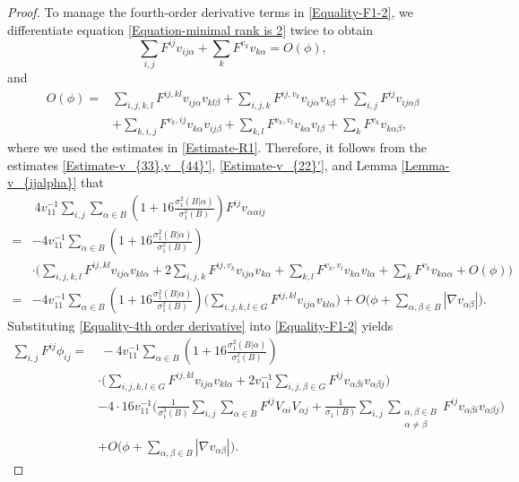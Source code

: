 \documentclass[11pt]{amsart}
\numberwithin{theorem}{section}
\numberwithin{equation}{section}
\begin{document}
\begin{proof}
To manage the fourth-order derivative terms in \eqref{Equality-F1-2}, we differentiate equation \eqref{Equation-minimal rank is 2} twice to obtain
\begin{equation}\label{Relation-1st condition-2}
\sum_{i, j}F^{ij}v_{ij\alpha}+\sum_kF^{v_k}v_{k\alpha}=O(\phi),
\end{equation}
and
\begin{align*}
O(\phi)=&\sum_{i,j,k,l}F^{ij,kl}v_{ij\alpha}v_{kl\beta}+\sum_{i,j,k}F^{ij,v_k}v_{ij\alpha}v_{k\beta}+\sum_{i,j}F^{ij}v_{ij\alpha\beta}\\
&+\sum_{k,i,j}F^{v_k,ij}v_{k\alpha}v_{ij\beta}+\sum_{k,l}F^{v_k,v_l}v_{k\alpha}v_{l\beta}+\sum_kF^{v_k}v_{k\alpha\beta},
\end{align*}
where we used the estimates in \eqref{Estimate-R1}. Therefore, it follows from the estimates \eqref{Estimate-v_{33},v_{44}'}, \eqref{Estimate-v_{22}'}, and Lemma \ref{Lemma-v_{ijalpha}} that
\begin{equation}\label{Equality-4th order derivative}
\begin{aligned}
&~4v_{11}^{-1}\sum_{i,j}\sum_{\alpha\in B}\left(1+16\frac{\sigma_1^2(B|\alpha)}{\sigma_1^2(B)}\right)F^{ij}v_{\alpha\alpha ij}\\
=&-4v_{11}^{-1}\sum_{\alpha\in B}\left(1+16\frac{\sigma_1^2(B|\alpha)}{\sigma_1^2(B)}\right)\\
&\cdot\bigg(\sum_{i,j,k,l}F^{ij,kl}v_{ij\alpha}v_{kl\alpha}+2\sum_{i,j,k}F^{ij,v_k}v_{ij\alpha}v_{k\alpha}+\sum_{k,l}F^{v_k,v_l}v_{k\alpha}v_{l\alpha}+\sum_kF^{v_k}v_{k\alpha\alpha}+O(\phi)\bigg)\\
=&-4v_{11}^{-1}\sum_{\alpha\in B}\left(1+16\frac{\sigma_1^2(B|\alpha)}{\sigma_1^2(B)}\right)\bigg(\sum_{i,j,k,l\in G}F^{ij,kl}v_{ij\alpha}v_{kl\alpha}\bigg)+O\bigg(\phi+\sum_{\alpha,\beta\in B}|\nabla v_{\alpha\beta}|\bigg).
\end{aligned}
\end{equation}
Substituting \eqref{Equality-4th order derivative} into \eqref{Equality-F1-2} yields
\begin{equation}\label{Equality-F2-2}
\begin{aligned}
\sum_{i,j}F^{ij}\phi_{ij}
=&~-4v_{11}^{-1}\sum_{\alpha\in B}\left(1+16\frac{\sigma_1^2(B|\alpha)}{\sigma_1^2(B)}\right)\\
&\cdot\bigg(\sum_{i,j,k,l\in G}F^{ij,kl}v_{ij\alpha}v_{kl\alpha}+2v_{11}^{-1}\sum_{i,j,\beta\in G}F^{ij}v_{\alpha\beta i}v_{\alpha\beta j}\bigg)\\
&-4\cdot16v_{11}^{-1}\bigg(\frac{1}{\sigma_1^3(B)}\sum_{i,j}\sum_{\alpha\in B}F^{ij}V_{\alpha i}V_{\alpha j}+\frac{1}{\sigma_1(B)}\sum_{i,j}\sum_{\substack{\alpha,\beta\in B\\ \alpha\neq\beta}}F^{ij}v_{\alpha\beta i}v_{\alpha\beta j}\bigg)\\
&+O\bigg(\phi+\sum_{\alpha,\beta\in B}|\nabla v_{\alpha\beta}|\bigg).
\end{aligned}
\end{equation}
 

\end{proof}
\end{document}
